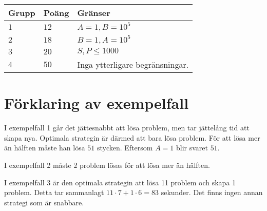 \noindent
\begin{tabular}{| l | l | p{12cm} |}
  \hline
  \textbf{Grupp} & \textbf{Poäng} & \textbf{Gränser} \\ \hline
  $1$    & $12$       & $A=1, B=10^5$ \\ \hline
  $2$    & $18$       & $B=1, A=10^5$ \\ \hline
  $3$    & $20$       & $S, P \leq 1000$ \\ \hline
  $4$    & $50$       & Inga ytterligare begränsningar. \\ \hline
\end{tabular}

\section*{Förklaring av exempelfall}
I exempelfall 1 går det jättesnabbt att lösa problem, men tar jättelång tid att skapa nya. Optimala strategin
är därmed att bara lösa problem. För att lösa mer än hälften måste han lösa $51$ stycken. Eftersom $A=1$ blir svaret
$51$.

I exempelfall 2 måste 2 problem lösas för att lösa mer än hälften.

I exempelfall 3 är den optimala strategin att lösa 11 problem och skapa 1 problem. Detta tar sammanlagt $11 \cdot 7 + 1 \cdot 6=83$ sekunder.
Det finns ingen annan strategi som är snabbare.
